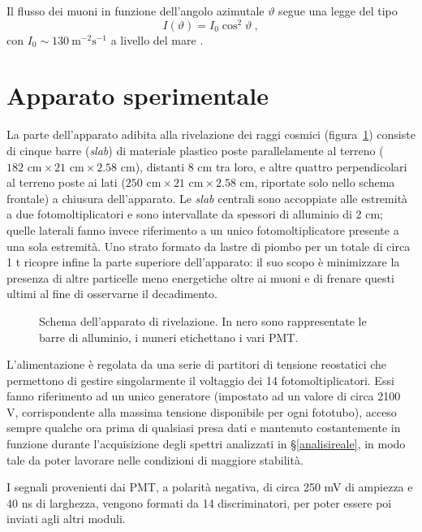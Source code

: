 \documentclass[10pt, oneside, a4paper]{article}   	%
\renewcommand{\theta}{\vartheta}			%
\begin{document}
Il flusso dei muoni in funzione dell'angolo azimutale $\theta$ segue una legge del tipo 
\[I(\theta)=I_0\cos^2\theta\ ,\]
con $I_0\sim130\ \text{m}^{-2}\text{s}^{-1}$ a livello del mare \cite{pdg2}.
%
\section{Apparato sperimentale}
La parte dell'apparato adibita alla rivelazione dei raggi cosmici (figura~\ref{appScheme}) consiste di cinque barre (\emph{slab}) di materiale plastico poste parallelamente al terreno ($182 \text{ cm}\times21\text{ cm}\times2.58$ cm), distanti 8 cm tra loro, e altre quattro perpendicolari al terreno poste ai lati ($250\text{ cm}\times21\text{ cm}\times2.58$ cm, riportate solo nello schema frontale) a chiusura dell'apparato. Le \emph{slab} centrali sono accoppiate alle estremità a due fotomoltiplicatori e sono intervallate da spessori di alluminio di 2 cm; quelle laterali fanno invece riferimento a un unico fotomoltiplicatore presente a una sola estremità. Uno strato formato da lastre di piombo per un totale di circa 1 t ricopre infine la parte superiore dell'apparato: il suo scopo è minimizzare la presenza di altre particelle meno energetiche oltre ai muoni e di frenare questi ultimi al fine di osservarne il decadimento.
%
\begin{figure}[h]
	\centering
		
	\caption{Schema dell'apparato di rivelazione. In nero sono rappresentate le barre di alluminio, i numeri etichettano i vari PMT.}
	\label{appScheme}
\end{figure}
%
L'alimentazione è regolata da una serie di partitori di tensione reostatici che permettono di gestire singolarmente il voltaggio dei 14 fotomoltiplicatori. Essi fanno riferimento ad un unico generatore (impostato ad un valore di circa 2100 V, corrispondente alla massima tensione disponibile per ogni fototubo), acceso sempre qualche ora prima di qualsiasi presa dati e mantenuto costantemente in funzione durante l'acquisizione degli spettri analizzati in \S\ref{analisireale}, in modo tale da poter lavorare nelle condizioni di maggiore stabilità.

I segnali provenienti dai PMT, a polarità negativa, di circa 250 mV di ampiezza e 40 ns di larghezza, vengono formati da 14 discriminatori, per poter essere poi inviati agli altri moduli.
%
%
\end{document}

